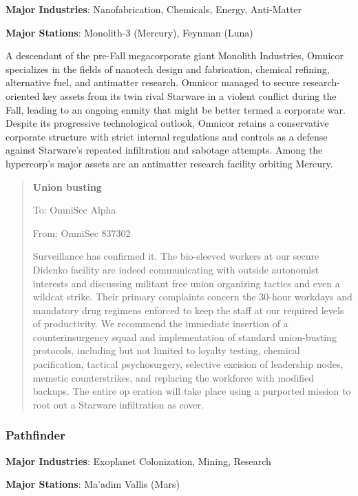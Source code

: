\textbf{Major Industries}: Nanofabrication, Chemicals, Energy, Anti-Matter

\textbf{Major Stations}: Monolith-3 (Mercury), Feynman (Luna)


A descendant of the pre-Fall megacorporate giant Monolith Industries,
Omnicor specializes in the fields of nanotech design and fabrication,
chemical refining, alternative fuel, and antimatter research. Omnicor
managed to secure research-oriented key assets from its twin rival
Starware in a violent conflict during the Fall, leading to an ongoing
enmity that might be better termed a corporate war. Despite its
progressive technological outlook, Omnicor retains a conservative
corporate structure with strict internal regulations and controls as a
defense against Starware's repeated infiltration and sabotage
attempts. Among the hypercorp's major assets are an antimatter
research facility orbiting Mercury.

\begin{quotation}
  \textbf{Union busting}

  To: OmniSec Alpha

  From: OmniSec 837302


  Surveillance has confirmed it. The bio-sleeved workers at our secure
  Didenko facility are indeed communicating with outside autonomist
  interests and discussing militant free union organizing tactics and
  even a wildcat strike. Their primary complaints concern the 30-hour
  workdays and mandatory drug regimens enforced to keep the staff at
  our required levels of productivity. We recommend the immediate
  insertion of a counterinsurgency squad and implementation of
  standard union-busting protocols, including but not limited to
  loyalty testing, chemical pacification, tactical psychosurgery,
  selective excision of leadership nodes, memetic counterstrikes, and
  replacing the workforce with modified backups. The entire op eration
  will take place using a purported mission to root out a Starware
  infiltration as cover.
\end{quotation}


\subsubsection{Pathfinder}
\label{sec:pathfinder}

\textbf{Major Industries}: Exoplanet Colonization, Mining, Research

\textbf{Major Stations}: Ma'adim Vallis (Mars)


